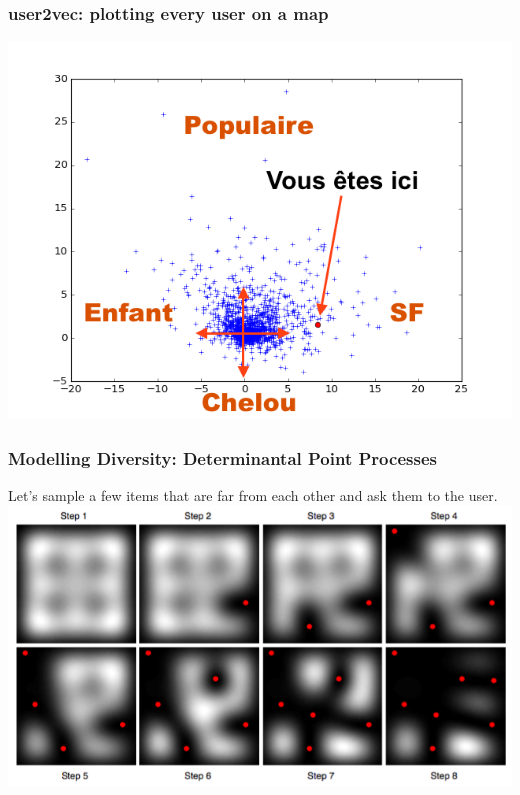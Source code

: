 \documentclass[handout]{beamer}
\begin{document}
\begin{frame}
	\frametitle{user2vec: plotting every user on a map}
	\includegraphics[width=\linewidth]{figures/here.png}
\end{frame}

\begin{frame}
    \frametitle{Modelling Diversity: Determinantal Point Processes}
    Let's sample a few items that are \alert{far from each other} and ask them to the user.
    \includegraphics[width=\linewidth]{figures/dpp.png}
\end{frame}
\end{document}
